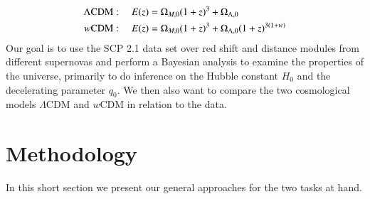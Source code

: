 \documentclass[11pt,a4paper]{article}
\begin{document}
\begin{align}
    \label{eq:lambda_model}
    \Lambda\text{CDM}: \hspace{10px} E(z) &= \Omega_{M,0}(1+z)^3 + \Omega_{\Lambda,0} \\
    \label{eq:omega_model}
    w\text{CDM}: \hspace{10px} E(z) &= \Omega_{M,0}(1+z)^3 + \Omega_{\Lambda,0}(1+z)^{3(1+w)} 
\end{align}
Our goal is to use the SCP 2.1 data set over red shift and distance modules from different supernovas and perform a Bayesian analysis to examine the properties of the universe, primarily to do inference on the Hubble constant $H_0$ and the decelerating parameter $q_0$. We then also want to compare the two cosmological models $\Lambda$CDM and $w$CDM in relation to the data.


\section{Methodology}
In this short section we present our general approaches for the two tasks at hand.
\end{document}
